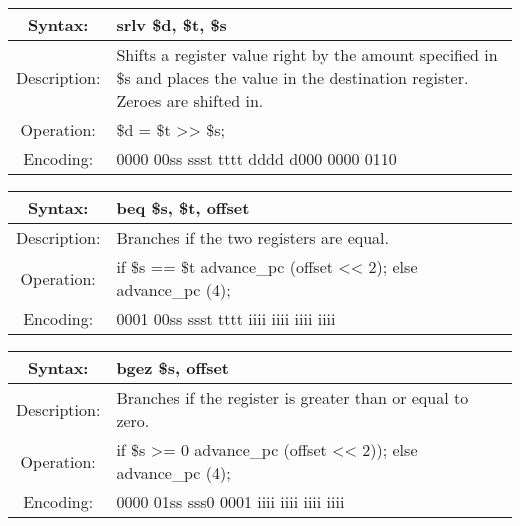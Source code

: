    \begin{table}[!hbp]
    \begin{tabularx}{\textwidth}{|c|X|}
        \hline
        Syntax: & srlv \$d, \$t, \$s \\
        \hline
        Description: & Shifts a register value right by the amount
                         specified in \$s and places the value in the 
                         destination register. Zeroes are shifted in. \\
        \hline
        Operation: & \$d = \$t >> \$s; \\
        \hline
        Encoding: & 0000 00ss ssst tttt dddd d000 0000 0110 \\
        \hline
    \end{tabularx}
    \end{table}

    \begin{table}[!hbp]
    \begin{tabularx}{\textwidth}{|c|X|}
        \hline
        Syntax: & beq \$s, \$t, offset \\
        \hline
        Description: & Branches if the two registers are equal. \\
        \hline
        Operation: & if \$s == \$t advance\_pc (offset << 2); else advance\_pc (4); \\
        \hline
        Encoding: & 0001 00ss ssst tttt iiii iiii iiii iiii \\
        \hline
    \end{tabularx}
    \end{table}

\clearpage  %

    \begin{table}[!hbp]
    \begin{tabularx}{\textwidth}{|c|X|}
        \hline
        Syntax: & bgez \$s, offset \\
        \hline
        Description: & Branches if the register is greater than or equal to zero. \\
        \hline
        Operation: & if \$s >= 0 advance\_pc (offset << 2)); else advance\_pc (4); \\
        \hline
        Encoding: & 0000 01ss sss0 0001 iiii iiii iiii iiii \\
        \hline
    \end{tabularx}
    \end{table}

